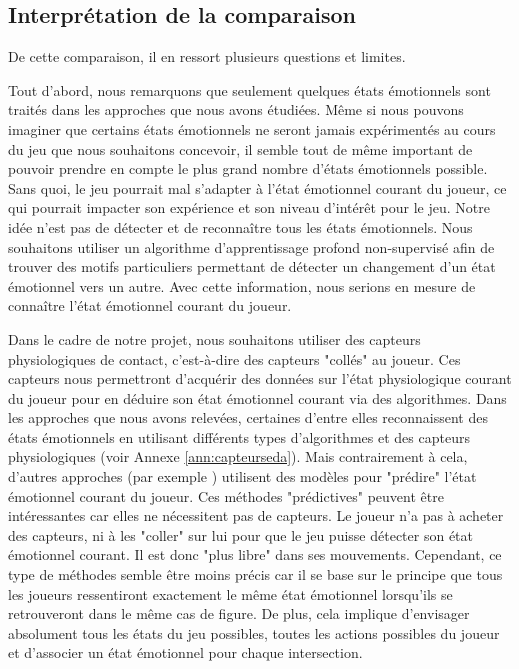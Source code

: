 \documentclass[11pt]{article}
\begin{document}
	\subsection{Interprétation de la comparaison}
        De cette comparaison, il en ressort plusieurs questions et limites.\par
		Tout d'abord, nous remarquons que seulement quelques états émotionnels sont traités dans les approches que nous avons étudiées.
		Même si nous pouvons imaginer que certains états émotionnels ne seront jamais expérimentés au cours du jeu que nous souhaitons concevoir, il semble tout de même important de pouvoir prendre en compte le plus grand nombre d'états émotionnels possible.
		Sans quoi, le jeu pourrait mal s'adapter à l'état émotionnel courant du joueur, ce qui pourrait impacter son expérience et son niveau d'intérêt pour le jeu.
		Notre idée n'est pas de détecter et de reconnaître tous les états émotionnels.
		Nous souhaitons utiliser un algorithme d'apprentissage profond non-supervisé afin de trouver des motifs particuliers permettant de détecter un changement d'un état émotionnel vers un autre.
		Avec cette information, nous serions en mesure de connaître l'état émotionnel courant du joueur.\par
		Dans le cadre de notre projet, nous souhaitons utiliser des capteurs physiologiques de contact, c'est-à-dire des capteurs "collés" au joueur.
		Ces capteurs nous permettront d'acquérir des données sur l'état physiologique courant du joueur pour en déduire son état émotionnel courant via des algorithmes.
		Dans les approches que nous avons relevées, certaines d'entre elles reconnaissent des états émotionnels en utilisant différents types d'algorithmes et des capteurs physiologiques (voir Annexe \ref{ann:capteurseda}).
		Mais contrairement à cela, d'autres approches (par exemple \cite{Mostefai_et_al._2019}) utilisent des modèles pour "prédire" l'état émotionnel courant du joueur.
		Ces méthodes "prédictives" peuvent être intéressantes car elles ne nécessitent pas de capteurs.
		Le joueur n'a pas à acheter des capteurs, ni à les "coller" sur lui pour que le jeu puisse détecter son état émotionnel courant.
		Il est donc "plus libre" dans ses mouvements.
		Cependant, ce type de méthodes semble être moins précis car il se base sur le principe que tous les joueurs ressentiront exactement le même état émotionnel lorsqu'ils se retrouveront dans le même cas de figure.
		De plus, cela implique d'envisager absolument tous les états du jeu possibles, toutes les actions possibles du joueur et d'associer un état émotionnel pour chaque intersection.
\end{document}
